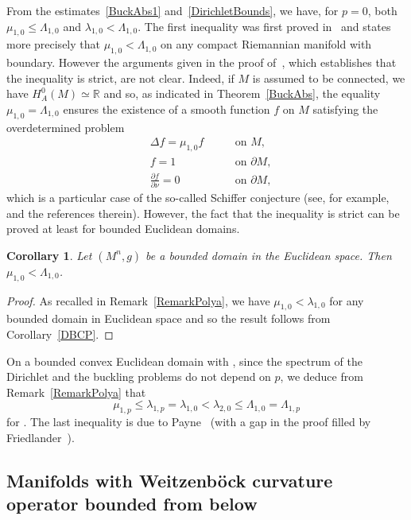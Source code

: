 \documentclass[10pt,a4paper]{amsart}
\numberwithin{equation}{section}
\newtheorem{Corollary}[Theorem]{Corollary}
\theoremstyle{definition}
\begin{document}
From the estimates~\eqref{BuckAbs1} and~\eqref{DirichletBounds}, we have, for $p=0$, both $\mu_{1,0}\leq\Lambda_{1,0}$ and $\lambda_{1,0}<\Lambda_{1,0}$.
The first inequality was first proved in~\cite{IliasShouman2019} and states more precisely that $\mu_{1,0}<\Lambda_{1,0}$ on any compact Riemannian manifold with boundary. However the arguments given in the proof of~\cite[Lem\-ma~3.1]{IliasShouman2019}, which establishes that the inequality is strict, are not clear.
Indeed, if $M$ is assumed to be connected, we have $H^0_A(M)\simeq \mathbb{R}$ and so, as indicated in Theorem~\ref{BuckAbs}, the equality $\mu_{1,0}=\Lambda_{1,0}$ ensures the existence of a smooth function $f$ on $M$ satisfying the overdetermined problem
\[
\begin{aligned}
&\Delta f =\mu_{1,0} f\ \quad  &&\textrm{on } M,\\
&f = 1\ \quad && \textrm{on }\partial M,\\
&\frac{\partial f}{\partial \nu} = 0 \ \quad &&\textrm{on }\partial M,
\end{aligned}
\]
which is a particular case of the so-called Schiffer conjecture (see, for example,~\cite{ProvenzanoSavo2023} and the references therein).
However, the fact that the inequality is strict can be proved at least for bounded Euclidean domains.
\begin{Corollary}%
Let $(M^n,g)$ be a bounded domain in the Euclidean space. Then $\mu_{1,0}<\Lambda_{1,0}$.
\end{Corollary}

\begin{proof} As recalled in Remark~\ref{RemarkPolya}, we have $\mu_{1,0}<\lambda_{1,0}$ for any bounded domain in Euclidean space and so the result follows from Corollary~\ref{DBCP}.
\end{proof}

On a bounded convex Euclidean domain with , since the spectrum of the Dirichlet and the buckling problems do not depend on $p$, we deduce from Remark~\ref{RemarkPolya} that
\[
\mu_{1,p}\leq\lambda_{1,p}=\lambda_{1,0}<\lambda_{2,0}\leq\Lambda_{1,0}=\Lambda_{1,p}
\]
for .
The last inequality is due to Payne~\cite{Payne1955} (with a gap in the proof filled by Friedlander~\cite{Friedlander2004}).

\subsection{Manifolds with Weitzenb\"ock curvature operator bounded from below}
\end{document}
